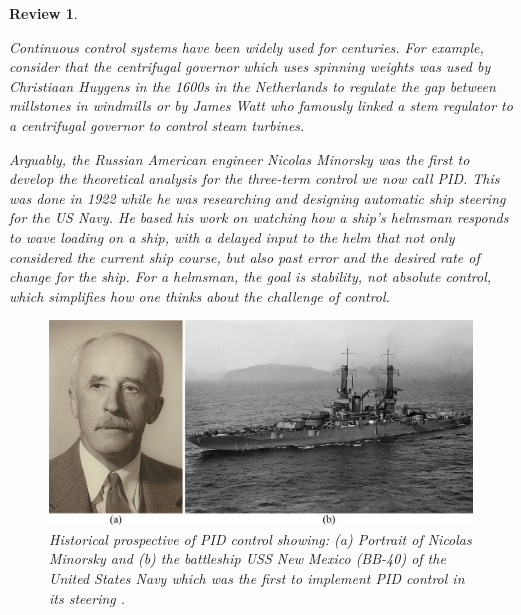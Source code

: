 \documentclass[12pt,letter]{article}
\numberwithin{ex}{section} %
\newtheorem{re}{Review}
\numberwithin{re}{section} %
\newenvironment{review}{\begin{mdframed}[middlelinewidth=2mm,roundcorner=20pt]\begin{re}\normalfont}{\end{re}\end{mdframed}}
\numberwithin{vcs}{section} %
\begin{document}
\begin{review}
	\label{sec:control_systems_review}
	
		Continuous control systems have been widely used for centuries. For example, consider that the centrifugal governor which uses spinning weights was used by Christiaan Huygens in the 1600s in the Netherlands to regulate the gap between millstones in windmills or by James Watt who famously linked a stem regulator to a centrifugal governor to control steam turbines. 

		Arguably, the Russian American engineer Nicolas Minorsky was the first to develop the theoretical analysis for the three-term control we now call PID. This was done in 1922 while he was researching and designing automatic ship steering for the US Navy. He based his work on watching how a ship's helmsman responds to wave loading on a ship, with a delayed input to the helm that not only considered the current ship course, but also past error and the desired rate of change for the ship. For a helmsman, the goal is stability, not absolute control, which simplifies how one thinks about the challenge of control.
		
	\begin{figure}[H]
		\centering
		\includegraphics[width=6in]{../figures/PID_Nicolas_Minorsky_and_USS_New_Mexico}
		\caption{Historical prospective of PID control showing: (a) Portrait of Nicolas Minorsky \protect\footnotemark[1] and (b) the battleship USS New Mexico (BB-40) of the United States Navy which was the first to implement PID control in its steering \protect\footnotemark[2]. }
		\label{fig:fragility_curve}
	\end{figure}

	
\end{review}
\end{document}
